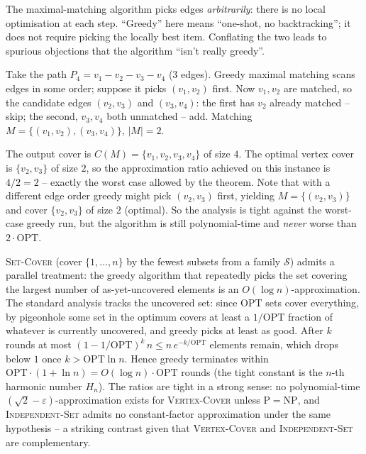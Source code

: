 \begin{remark}
The maximal-matching algorithm picks edges \emph{arbitrarily}: there is no local optimisation at each step. ``Greedy'' here means ``one-shot, no backtracking''; it does not require picking the locally best item. Conflating the two leads to spurious objections that the algorithm ``isn't really greedy''.
\end{remark}

\begin{example}
\label{ex:vc_run}
Take the path $P_4 = v_1 - v_2 - v_3 - v_4$ (3 edges). Greedy maximal matching scans edges in some order; suppose it picks $(v_1,v_2)$ first. Now $v_1, v_2$ are matched, so the candidate edges $(v_2,v_3)$ and $(v_3,v_4)$: the first has $v_2$ already matched -- skip; the second, $v_3, v_4$ both unmatched -- add. Matching $M = \{(v_1,v_2), (v_3,v_4)\}$, $|M|=2$.

The output cover is $C(M) = \{v_1, v_2, v_3, v_4\}$ of size $4$. The optimal vertex cover is $\{v_2, v_3\}$ of size $2$, so the approximation ratio achieved on this instance is $4/2 = 2$ -- exactly the worst case allowed by the theorem. Note that with a different edge order greedy might pick $(v_2,v_3)$ first, yielding $M=\{(v_2,v_3)\}$ and cover $\{v_2,v_3\}$ of size $2$ (optimal). So the analysis is tight against the worst-case greedy run, but the algorithm is still polynomial-time and \emph{never} worse than $2 \cdot \mathrm{OPT}$.
\end{example}

\begin{remark}
\textsc{Set-Cover} (cover $\{1,\dots,n\}$ by the fewest subsets from a family $\mathcal{S}$) admits a parallel treatment: the greedy algorithm that repeatedly picks the set covering the largest number of as-yet-uncovered elements is an $O(\log n)$-approximation. The standard analysis tracks the uncovered set: since $\mathrm{OPT}$ sets cover everything, by pigeonhole some set in the optimum covers at least a $1/\mathrm{OPT}$ fraction of whatever is currently uncovered, and greedy picks at least as good. After $k$ rounds at most $(1-1/\mathrm{OPT})^k\, n \le n\,e^{-k/\mathrm{OPT}}$ elements remain, which drops below $1$ once $k > \mathrm{OPT}\ln n$. Hence greedy terminates within $\mathrm{OPT}\cdot(1 + \ln n) = O(\log n) \cdot \mathrm{OPT}$ rounds (the tight constant is the $n$-th harmonic number $H_n$). The ratios are tight in a strong sense: no polynomial-time $(\sqrt{2}-\varepsilon)$-approximation exists for \textsc{Vertex-Cover} unless $\mathrm{P}=\mathrm{NP}$, and \textsc{Independent-Set} admits no constant-factor approximation under the same hypothesis -- a striking contrast given that \textsc{Vertex-Cover} and \textsc{Independent-Set} are complementary.
\end{remark}

